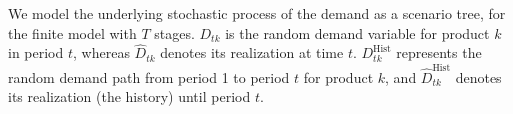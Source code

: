 \documentclass[10pt]{article}
\newcommand{\ti}{t} %
\newcommand{\TI}{\mathcal{T}}
\newcommand{\Ti}{T}
\newcommand{\ka}{k} %
\newcommand{\jey}{j} %
\newcommand{\Bi}{B} %
\newcommand{\Vi}{v} %
\newcommand{\cn}{\mathcal{C}(n) }
\begin{document}
 
 












We model the underlying stochastic process of the demand as a scenario tree, for the finite model with $\Ti$ stages. 
$D_{\ti \ka}$ is the random demand variable for product $\ka$ in period $\ti$, whereas $\hat{D}_{\ti \ka}$ denotes its realization at time $\ti$.
$D^\text{Hist}_{\ti \ka}$ represents the random demand path from period 1 to period $\ti$ for product $\ka$, and $\hat{D}^\text{Hist}_{\ti\ka}$ denotes its realization (the history) until period $\ti$.
\end{document}
